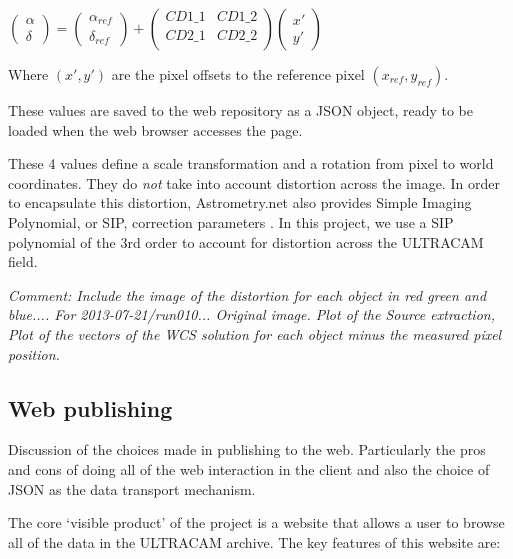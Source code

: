 $\left(\begin{array}{c} \alpha \\ \delta \end{array} \right) = \left(\begin{array}{c} \alpha_{ref} \\ \delta_{ref} \end{array} \right) + 
\left(\begin{array}{cc}  CD1\_1 & CD1\_2 \\ CD2\_1  & CD2\_2 \\ \end{array}\right) 
\left(\begin{array}{c} x' \\ y' \end{array} \right)$

Where $(x', y')$ are the pixel offsets to the reference pixel $(x_{ref}, y_{ref})$.

These values are saved to the web repository as a JSON object, ready to be loaded when the web browser accesses the page. 

These 4 values define a scale transformation and a rotation from pixel to world coordinates. They do \emph{not} take into account distortion across the image. In order to encapsulate this distortion, Astrometry.net also provides Simple Imaging Polynomial, or SIP, correction parameters \cite{sippolynomial}. In this project, we use a SIP polynomial of the 3rd order to account for distortion across the ULTRACAM field. 

\emph{Comment: Include the image of the distortion for each object in red green and blue.... For 2013-07-21/run010... Original image. Plot of the Source extraction, Plot of the vectors of the WCS solution for each object minus the measured pixel position.}

\subsection{Web publishing}

Discussion of the choices made in publishing to the web. Particularly the pros and cons of doing all of the web interaction in the client and also the choice of JSON as the data transport mechanism. 

The core `visible product' of the project is a website that allows a user to browse all of the data in the ULTRACAM archive. The key features of this website are:

